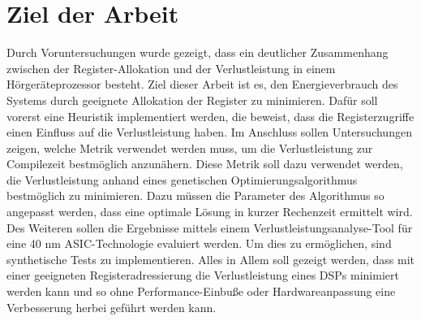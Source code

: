 \section{Ziel der Arbeit}
\label{sec:ziele}
Durch Voruntersuchungen wurde gezeigt, dass ein deutlicher Zusammenhang zwischen der Register-Allokation und der Verlustleistung in einem Hörgeräteprozessor besteht. Ziel dieser Arbeit ist es, den Energieverbrauch des Systems durch geeignete Allokation der Register zu minimieren. Dafür soll vorerst eine Heuristik implementiert werden, die beweist, dass die Registerzugriffe einen Einfluss auf die Verlustleistung haben. Im Anschluss sollen Untersuchungen zeigen, welche Metrik verwendet werden muss, um die Verlustleistung zur Compilezeit bestmöglich anzunähern. Diese Metrik soll dazu verwendet werden, die Verlustleistung anhand eines genetischen Optimierungsalgorithmus bestmöglich zu minimieren. Dazu müssen die Parameter des Algorithmus so angepasst werden, dass eine optimale Lösung in kurzer Rechenzeit ermittelt wird. Des Weiteren sollen die Ergebnisse mittels einem Verlustleistungsanalyse-Tool für eine 40 nm ASIC-Technologie evaluiert werden. Um dies zu ermöglichen, sind synthetische Tests zu implementieren. Alles in Allem soll gezeigt werden, dass mit einer geeigneten Registeradressierung die Verlustleistung eines DSPs minimiert werden kann und so ohne Performance-Einbuße oder Hardwareanpassung eine Verbesserung herbei geführt werden kann.

%
